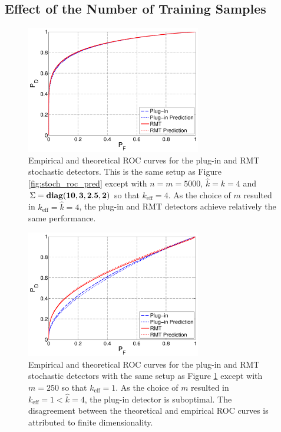 \subsection{Effect of the Number of Training Samples}

\begin{figure}
\centering
\includegraphics[width=3in]{figures/stoch_m_large.pdf}
\caption{Empirical and theoretical ROC curves for the plug-in and RMT stochastic detectors. This is the same setup as Figure \ref{fig:stoch_roc_pred} except with $n=m=5000$, $\widehat{k}=k=4$ and $\Sigma = \mathop{\bf diag}({\bf{10,3,2.5,2}})$ so that $k_{\text{eff}}=4$. As the choice of $m$ resulted in $k_\text{eff}=\widehat{k}=4$, the plug-in and RMT detectors achieve relatively the same performance.}
\label{fig:stoch_m_large}
\end{figure}

\begin{figure}
\centering
\includegraphics[width=3in]{figures/stoch_m_small.pdf}
\caption{Empirical and theoretical ROC curves for the plug-in and RMT stochastic detectors with the same setup as Figure \ref{fig:stoch_m_large} except with $m=250$ so that $k_{\text{eff}}=1$. As the choice of $m$ resulted in $k_\text{eff}=1<\widehat{k}=4$, the plug-in detector is suboptimal. The disagreement between the theoretical and empirical ROC curves is attributed to finite dimensionality.}
\label{fig:stoch_m_small}
\end{figure}

